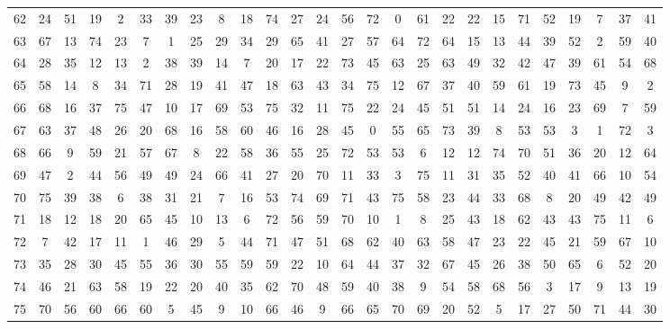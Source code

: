 \begin{table}
\begin{tabular}{c c c c c c c c c c c c c c c c c c c c c c c c c c }
62 & 24 & 51 & 19 & 2 & 33 & 39 & 23 & 8 & 18 & 74 & 27 & 24 & 56 & 72 & 0 & 61 & 22 & 22 & 15 & 71 & 52 & 19 & 7 & 37 & 41 \\
63 & 67 & 13 & 74 & 23 & 7 & 1 & 25 & 29 & 34 & 29 & 65 & 41 & 27 & 57 & 64 & 72 & 64 & 15 & 13 & 44 & 39 & 52 & 2 & 59 & 40 \\
64 & 28 & 35 & 12 & 13 & 2 & 38 & 39 & 14 & 7 & 20 & 17 & 22 & 73 & 45 & 63 & 25 & 63 & 49 & 32 & 42 & 47 & 39 & 61 & 54 & 68 \\
65 & 58 & 14 & 8 & 34 & 71 & 28 & 19 & 41 & 47 & 18 & 63 & 43 & 34 & 75 & 12 & 67 & 37 & 40 & 59 & 61 & 19 & 73 & 45 & 9 & 2 \\
66 & 68 & 16 & 37 & 75 & 47 & 10 & 17 & 69 & 53 & 75 & 32 & 11 & 75 & 22 & 24 & 45 & 51 & 51 & 14 & 24 & 16 & 23 & 69 & 7 & 59 \\
67 & 63 & 37 & 48 & 26 & 20 & 68 & 16 & 58 & 60 & 46 & 16 & 28 & 45 & 0 & 55 & 65 & 73 & 39 & 8 & 53 & 53 & 3 & 1 & 72 & 3 \\
68 & 66 & 9 & 59 & 21 & 57 & 67 & 8 & 22 & 58 & 36 & 55 & 25 & 72 & 53 & 53 & 6 & 12 & 12 & 74 & 70 & 51 & 36 & 20 & 12 & 64 \\
69 & 47 & 2 & 44 & 56 & 49 & 49 & 24 & 66 & 41 & 27 & 20 & 70 & 11 & 33 & 3 & 75 & 11 & 31 & 35 & 52 & 40 & 41 & 66 & 10 & 54 \\
70 & 75 & 39 & 38 & 6 & 38 & 31 & 21 & 7 & 16 & 53 & 74 & 69 & 71 & 43 & 75 & 58 & 23 & 44 & 33 & 68 & 8 & 20 & 49 & 42 & 49 \\
71 & 18 & 12 & 18 & 20 & 65 & 45 & 10 & 13 & 6 & 72 & 56 & 59 & 70 & 10 & 1 & 8 & 25 & 43 & 18 & 62 & 43 & 43 & 75 & 11 & 6 \\
72 & 7 & 42 & 17 & 11 & 1 & 46 & 29 & 5 & 44 & 71 & 47 & 51 & 68 & 62 & 40 & 63 & 58 & 47 & 23 & 22 & 45 & 21 & 59 & 67 & 10 \\
73 & 35 & 28 & 30 & 45 & 55 & 36 & 30 & 55 & 59 & 59 & 22 & 10 & 64 & 44 & 37 & 32 & 67 & 45 & 26 & 38 & 50 & 65 & 6 & 52 & 20 \\
74 & 46 & 21 & 63 & 58 & 19 & 22 & 20 & 40 & 35 & 62 & 70 & 48 & 59 & 40 & 38 & 9 & 54 & 58 & 68 & 56 & 3 & 17 & 9 & 13 & 19 \\
75 & 70 & 56 & 60 & 66 & 60 & 5 & 45 & 9 & 10 & 66 & 46 & 9 & 66 & 65 & 70 & 69 & 20 & 52 & 5 & 17 & 27 & 50 & 71 & 44 & 30 \\
\hline
\end{tabular}
\end{table}